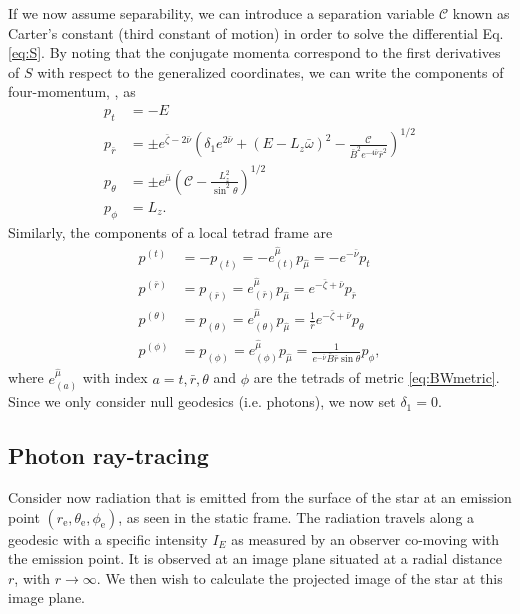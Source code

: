 \documentclass{aa}
\makeatletter
\def\fvec#1{\underline{\sbox\tw@{$#1$}\dp\tw@\z@\box\tw@}}
\newcommand{\refe}[1]{#1}
\newcommand{\Ca}{\ensuremath{\mathcal{C}}}
\newcommand{\rb}{\ensuremath{\bar{r}}}
\newcommand{\wb}{\ensuremath{\bar{\omega}}}
\newcommand{\nub}{\ensuremath{\bar{\nu}}}
\newcommand{\zetab}{\ensuremath{\bar{\zeta}}}
\newcommand{\Bb}{\ensuremath{\bar{B}}}
\newcommand{\mub}{\ensuremath{\bar{\mu}}}
\makeatother
\begin{document}
If we now assume separability, we can introduce a separation variable $\Ca$ known as Carter's constant (third constant of motion) in order to solve the differential Eq. \eqref{eq:S}.  
By noting that the conjugate momenta correspond to the first derivatives of $S$ with respect to the generalized coordinates, we can write the components of four-momentum, \fvec{p}, as 
\begin{align}
  p_t        &= -E \label{eq:p_t}\\
  p_{\rb}    &= \pm e^{\zetab - 2\nub} \left( \delta_1 e^{2\nub} + (E - L_z \wb)^2 - \frac{\Ca}{\Bb^2 e^{-4\nub} \rb^2} \right)^{1/2}\label{eq:p_r}\\
  p_{\theta} &= \pm e^{\mub} \left( \Ca - \frac{L_z^2}{\sin^2\theta} \right)^{1/2}\label{eq:p_the}\\
  p_{\phi}   &= L_z\label{eq:p_p}.
\end{align}
Similarly, the components of a local tetrad frame are
\begin{align}
  p^{(t)} &= -p_{(t)} = -e_{(t)}^{\hat{\mu}} p_{\hat{\mu}} = -e^{-\nub}p_t \label{eq:tetp_t}\\
  p^{(\rb)} &= p_{(\rb)} = e_{(\rb)}^{\hat{\mu}} p_{\hat{\mu}} = e^{-\zetab + \nub} p_{\rb} \label{eq:tetp_r}\\
  p^{(\theta)} &= p_{(\theta)} = e_{(\theta)}^{\hat{\mu}} p_{\hat{\mu}} = \frac{1}{\rb} e^{-\zetab+\nub} p_{\theta} \label{eq:tetp_theta}\\
  p^{(\phi)} &= p_{(\phi)} = e_{(\phi)}^{\hat{\mu}} p_{\hat{\mu}} = \frac{1}{e^{-\nub} \Bb \rb \sin\theta} p_{\phi} \label{eq:tetp_phi},
\end{align}
where $e^{\hat{\mu}}_{(a)}$ with index $a = t, \rb, \theta$ and $\phi$ are the tetrads of metric \eqref{eq:BWmetric}.
Since we only consider null geodesics (i.e. photons), we now set $\delta_1 = 0$.

\subsection{\refe{Photon ray-tracing} }\label{sect:raytracing}
\refe{Consider now radiation that is emitted from the surface of the star at an emission point $(r_{\mathrm{e}},\theta_{\mathrm{e}},\phi_{\mathrm{e}})$, as seen in the static frame.}
The radiation travels along a geodesic with a specific intensity $I_{E}$ as measured by an observer co-moving with the emission point.  
It is observed at an image plane situated at a radial distance $r$, with $r\rightarrow\infty$.  
We then wish to calculate the projected image of the star at this image plane.
\end{document}
